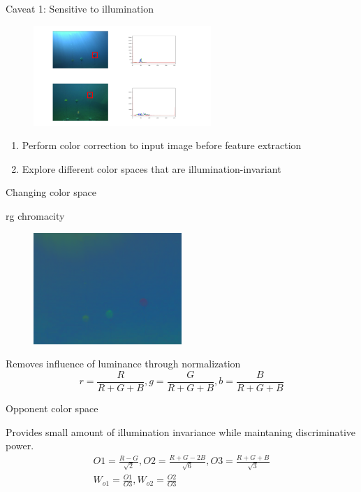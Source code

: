 \documentclass[13pt]{beamer}
\begin{document}
\begin{frame}{Caveat 1: Sensitive to illumination}

  \begin{figure}[ht]
      \centering
      \includegraphics[width=0.6\textwidth, height=0.3\textwidth]{figs/illumsensitive.png}
  \end{figure}

  \begin{enumerate}
    \item Perform color correction to input image before feature extraction
    \item Explore different color spaces that are illumination-invariant
  \end{enumerate}

\end{frame}

\begin{frame}[standout]{}
  Changing color space
\end{frame}

\begin{frame}{rg chromacity}

  \begin{figure}[ht]
      \centering
      \includegraphics[width=0.5\textwidth, height=0.3\textwidth]{figs/rg.png}
  \end{figure}

  Removes influence of luminance through normalization 
  \[
    r = \frac{R}{R + G + B}, g = \frac{G}{R + G + B}, b = \frac{B}{R + G + B}
  \]
\end{frame}

\begin{frame}{Opponent color space}

  Provides small amount of illumination invariance while maintaning
  discriminative power.
  \[
  \begin{aligned}
    O1 = \frac{R - G}{\sqrt{2}}, O2 = \frac{R + G - 2B}{\sqrt{6}}, O3 = \frac{R +
      G + B}{\sqrt{3}} \\
    W_{o1} = \frac{O1}{O3}, W_{o2} = \frac{O2}{O3}
  \end{aligned}
  \]
\end{frame}
\end{document}
